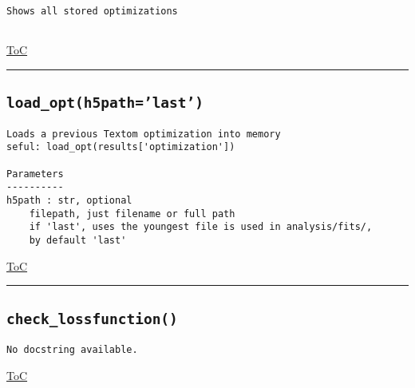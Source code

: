 \documentclass{article}
\begin{document}
\begin{lstlisting}[language=docstring]
Shows all stored optimizations
    
\end{lstlisting}

\begin{flushright}

\hyperref[toc]{ToC}

\end{flushright}



\vspace{5mm}

\hrule

\subsection*{\texttt{load\_opt(h5path='last')}}

\begin{lstlisting}[language=docstring]
Loads a previous Textom optimization into memory
seful: load_opt(results['optimization'])

Parameters
----------
h5path : str, optional
    filepath, just filename or full path
    if 'last', uses the youngest file is used in analysis/fits/, 
    by default 'last'
\end{lstlisting}

\begin{flushright}

\hyperref[toc]{ToC}

\end{flushright}



\vspace{5mm}

\hrule

\subsection*{\texttt{check\_lossfunction()}}

\begin{lstlisting}[language=docstring]
No docstring available.
\end{lstlisting}

\begin{flushright}

\hyperref[toc]{ToC}

\end{flushright}
\end{document}
